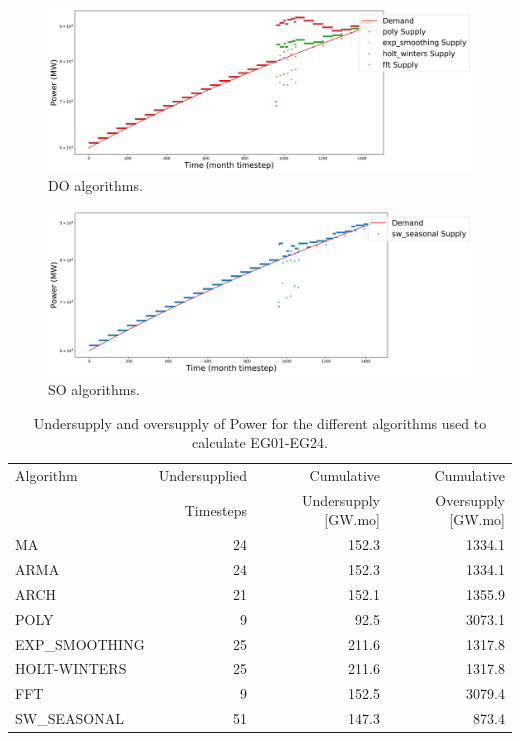 \documentclass[11pt]{article}
\begin{document}
\begin{figure}[H]
	\centering
	\includegraphics[width=\textwidth]{30-figures/lin-30-power-buffer02.png} 
	\hfill
	\caption{DO algorithms.}
	\label{fig:30-lin-DO}
\end{figure}

\begin{figure}[H]
	\centering
	\includegraphics[width=\textwidth]{30-figures/lin-30-power-buffer03.png} 
	\hfill
	\caption{SO algorithms.}
	\label{fig:30-lin-SO}
\end{figure}

\begin{table}[H]
	\centering
	\caption{Undersupply and oversupply of Power for the different algorithms used to calculate EG01-EG24.}
	\label{tab:30-lin-power}
	\begin{tabularx}{\textwidth}{lRRR}
		\hline
		Algorithm & Undersupplied & Cumulative  & Cumulative \\
		& Timesteps     & Undersupply [GW.mo]  & Oversupply [GW.mo] \\ \hline
		MA        & 24 & 152.3 & 1334.1 \\ 
		ARMA      & 24 & 152.3 & 1334.1 \\ 
		ARCH      & 21 & 152.1 & 1355.9 \\ 
		POLY      &  9 & 92.5 & 3073.1 \\ 
		EXP\_SMOOTHING 	& 25 & 211.6 & 1317.8 \\ 
		HOLT-WINTERS  	& 25 & 211.6 & 1317.8 \\ 
		FFT       & 9 & 152.5 & 3079.4 \\ 
		SW\_SEASONAL  & 51 & 147.3 & 873.4 \\ \hline
	\end{tabularx}
\end{table}
\end{document}
